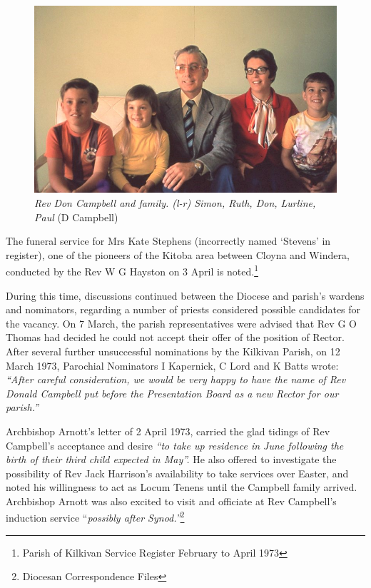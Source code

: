 \begin{figure}
\begin{center}
\includegraphics[width=1.\linewidth,center]{../images/DonCampbellAndFamily.png}
\caption{{\itshape Rev Don Campbell and family. (l-r) Simon, Ruth, Don, Lurline, Paul} {\scriptsize(D Campbell)}}
\end{center}
\end{figure}




The funeral service for Mrs Kate Stephens (incorrectly named `Stevens' in register), one of the pioneers of the Kitoba area between Cloyna and Windera, conducted by the Rev W G Hayston on 3 April is noted.\footnote{Parish of Kilkivan Service Register February to April 1973}


During this time, discussions continued between the Diocese and parish's wardens and nominators, regarding a number of priests considered possible candidates for the vacancy. On 7 March, the parish representatives were advised that Rev G O Thomas had decided he could not accept their offer of the position of Rector. After several further unsuccessful nominations by the Kilkivan Parish, on 12 March 1973, Parochial Nominators I Kapernick, C Lord and K Batts wrote: \emph{``After careful consideration, we would be very happy to have the name of Rev Donald Campbell put before the Presentation Board as a new Rector for our parish.''}



Archbishop Arnott's letter of 2 April 1973, carried the glad tidings of Rev Campbell's acceptance and desire \emph{``to take up residence in June following the birth of their third child expected in May''.} He also offered to investigate the possibility of Rev Jack Harrison's availability to take services over Easter, and noted his willingness to act as Locum Tenens until the Campbell family arrived. Archbishop Arnott was also excited to visit and officiate at Rev Campbell's induction service ``\emph{possibly after Synod.''}\footnote{Diocesan Correspondence Files}


